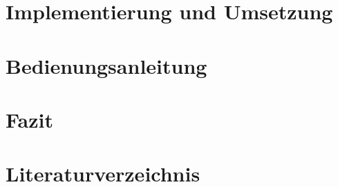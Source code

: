 \documentclass[12pt]{article}
\begin{document}
    \section{Implementierung und Umsetzung}
        
    
    \section{Bedienungsanleitung}
        
    
    \section{Fazit}
        
    
    \newpage
    
    \appendix
    
    \section*{Literaturverzeichnis}
        \printbibliography
    
    \newpage
    
        \listoffigures
\end{document}

